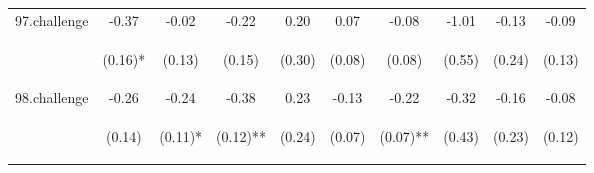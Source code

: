 \begin{center}
\begin{tabular}{lccccccccc}
\noalign{\smallskip}97.challenge & -0.37 & -0.02 & -0.22 & 0.20 & 0.07 & -0.08 & -1.01 & -0.13 & -0.09\\
 & \begin{footnotesize}(0.16)*\end{footnotesize} & \begin{footnotesize}(0.13)\end{footnotesize} & \begin{footnotesize}(0.15)\end{footnotesize} & \begin{footnotesize}(0.30)\end{footnotesize} & \begin{footnotesize}(0.08)\end{footnotesize} & \begin{footnotesize}(0.08)\end{footnotesize} & \begin{footnotesize}(0.55)\end{footnotesize} & \begin{footnotesize}(0.24)\end{footnotesize} & \begin{footnotesize}(0.13)\end{footnotesize}\\
\noalign{\smallskip}98.challenge & -0.26 & -0.24 & -0.38 & 0.23 & -0.13 & -0.22 & -0.32 & -0.16 & -0.08\\
 & \begin{footnotesize}(0.14)\end{footnotesize} & \begin{footnotesize}(0.11)*\end{footnotesize} & \begin{footnotesize}(0.12)**\end{footnotesize} & \begin{footnotesize}(0.24)\end{footnotesize} & \begin{footnotesize}(0.07)\end{footnotesize} & \begin{footnotesize}(0.07)**\end{footnotesize} & \begin{footnotesize}(0.43)\end{footnotesize} & \begin{footnotesize}(0.23)\end{footnotesize} & \begin{footnotesize}(0.12)\end{footnotesize}\\

\end{tabular}
\end{center}
